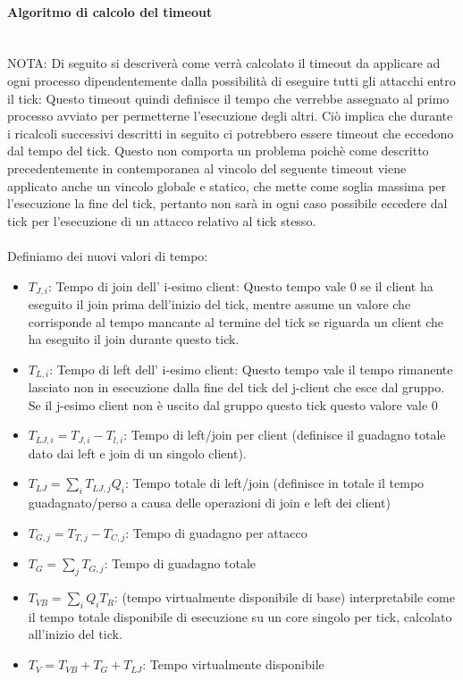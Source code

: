 \documentclass[11pt]{article}
\begin{document}
\paragraph{Algoritmo di calcolo del timeout}\mbox{}\\
NOTA: Di seguito si descriverà come verrà calcolato il timeout da applicare ad ogni processo dipendentemente dalla possibilità di eseguire tutti gli attacchi entro il tick: Questo timeout quindi definisce il tempo che verrebbe assegnato al primo processo avviato per permetterne l'esecuzione degli altri. Ciò implica che durante i ricalcoli successivi descritti in seguito ci potrebbero essere timeout che eccedono dal tempo del tick. Questo non comporta un problema poichè come descritto precedentemente in contemporanea al vincolo del seguente timeout viene applicato anche un vincolo globale e statico, che mette come soglia massima per l'esecuzione la fine del tick, pertanto non sarà in ogni caso possibile eccedere dal tick per l'esecuzione di un attacco relativo al tick stesso.\\\\
Definiamo dei nuovi valori di tempo:
\begin{itemize}
	\item $T_{J, i}$: Tempo di join dell' i-esimo client: Questo tempo vale 0 se il client ha eseguito il join prima dell'inizio del tick, mentre assume un valore che corrisponde al tempo mancante al termine del tick se riguarda un client che ha eseguito il join durante questo tick.
	\item $T_{L, i}$: Tempo di left dell' i-esimo client: Questo tempo vale il tempo rimanente lasciato non in esecuzione  dalla fine del tick del j-client che esce dal gruppo. Se il j-esimo client non è uscito dal gruppo questo tick questo valore vale 0
	\item $T_{LJ, i} = T_{J,i}-T_{l,i}$: Tempo di left/join per client (definisce il guadagno totale dato dai left e join di un singolo client).
	\item $T_{LJ} = \sum_{i} T_{LJ,j} Q_i$: Tempo totale di left/join (definisce in totale il tempo guadagnato/perso a causa delle operazioni di join e left dei client)
	\item $T_{G, j} = T_{T,j} - T_{C, j}$: Tempo di guadagno per attacco
	\item $T_G = \sum_{j} T_{G,j}$: Tempo di guadagno totale
	\item $T_{VB} = \sum_{i} Q_i T_R$: (tempo virtualmente disponibile di base) interpretabile come il tempo totale disponibile di esecuzione su un core singolo per tick, calcolato all'inizio del tick.
	\item $T_{V} = T_{VB} + T_G + T_{LJ}$: Tempo virtualmente disponibile
\end{itemize}
\end{document}
